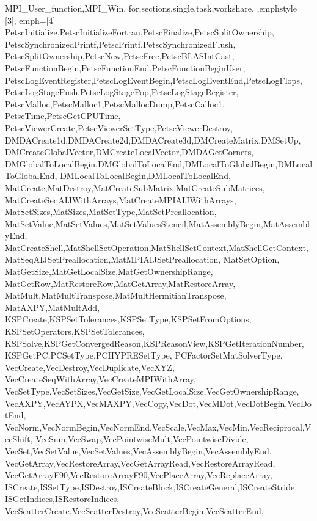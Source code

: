 {{    MPI_User_function,MPI_Win,
    for,sections,single,task,workshare,
  },emphstyle={[3]\color{yellow!30!brown}\bfseries},
  emph={[4] %
    PetscInitialize,PetscInitializeFortran,PetscFinalize,PetscSplitOwnership,
    PetscSynchronizedPrintf,PetscPrintf,PetscSynchronizedFlush,
    PetscSplitOwnership,PetscNew,PetscFree,PetscBLASIntCast,
    PetscFunctionBegin,PetscFunctionEnd,PetscFunctionBeginUser,
    PetscLogEventRegister,PetscLogEventBegin,PetscLogEventEnd,PetscLogFlops,
    PetscLogStagePush,PetscLogStagePop,PetscLogStageRegister,
    PetscMalloc,PetscMalloc1,PetscMallocDump,PetscCalloc1,
    PetscTime,PetscGetCPUTime,
    PetscViewerCreate,PetscViewerSetType,PetscViewerDestroy,
    DMDACreate1d,DMDACreate2d,DMDACreate3d,DMCreateMatrix,DMSetUp,
    DMCreateGlobalVector,DMCreateLocalVector,DMDAGetCorners,
    DMGlobalToLocalBegin,DMGlobalToLocalEnd,DMLocalToGlobalBegin,DMLocalToGlobalEnd,
    DMLocalToLocalBegin,DMLocalToLocalEnd,
    MatCreate,MatDestroy,MatCreateSubMatrix,MatCreateSubMatrices,
    MatCreateSeqAIJWithArrays,MatCreateMPIAIJWithArrays,
    MatSetSizes,MatSizes,MatSetType,MatSetPreallocation,
    MatSetValue,MatSetValues,MatSetValuesStencil,MatAssemblyBegin,MatAssemblyEnd,
    MatCreateShell,MatShellSetOperation,MatShellSetContext,MatShellGetContext,
    MatSeqAIJSetPreallocation,MatMPIAIJSetPreallocation,    
    MatSetOption,
    MatGetSize,MatGetLocalSize,MatGetOwnershipRange,
    MatGetRow,MatRestoreRow,MatGetArray,MatRestoreArray,
    MatMult,MatMultTranspose,MatMultHermitianTranspose,
    MatAXPY,MatMultAdd,
    KSPCreate,KSPSetTolerances,KSPSetType,KSPSetFromOptions,
    KSPSetOperators,KSPSetTolerances,
    KSPSolve,KSPGetConvergedReason,KSPReasonView,KSPGetIterationNumber,
    KSPGetPC,PCSetType,PCHYPRESetType,
    PCFactorSetMatSolverType,
    VecCreate,VecDestroy,VecDuplicate,VecXYZ,
    VecCreateSeqWithArray,VecCreateMPIWithArray,
    VecSetType,VecSetSizes,VecGetSize,VecGetLocalSize,VecGetOwnershipRange,
    VecAXPY,VecAYPX,VecMAXPY,VecCopy,VecDot,VecMDot,VecDotBegin,VecDotEnd,
    VecNorm,VecNormBegin,VecNormEnd,VecScale,VecMax,VecMin,VecReciprocal,VecShift,
    VecSum,VecSwap,VecPointwiseMult,VecPointwiseDivide,
    VecSet,VecSetValue,VecSetValues,VecAssemblyBegin,VecAssemblyEnd,
    VecGetArray,VecRestoreArray,VecGetArrayRead,VecRestoreArrayRead,
    VecGetArrayF90,VecRestoreArrayF90,VecPlaceArray,VecReplaceArray,
    ISCreate,ISSetType,ISDestroy,ISCreateBlock,ISCreateGeneral,ISCreateStride,
    ISGetIndices,ISRestoreIndices,
    VecScatterCreate,VecScatterDestroy,VecScatterBegin,VecScatterEnd,
}}
